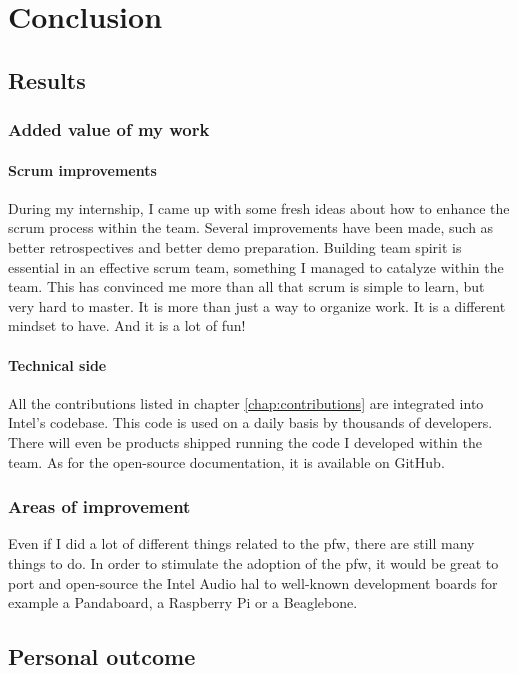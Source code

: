 \chapter{Conclusion}

\section{Results}

\subsection{Added value of my work}
\subsubsection{Scrum improvements}
During my internship, I came up with some fresh ideas about how to enhance the \gls{scrum} process within the team.
Several improvements have been made, such as better retrospectives and better demo preparation.
Building team spirit is essential in an effective \gls{scrum} team, something I managed to catalyze within the team.
This has convinced me more than all that \gls{scrum} is simple to learn, but very hard to master.
It is more than just a way to organize work. It is a different mindset to have. And it is a lot of fun!

\subsubsection{Technical side}
All the contributions listed in chapter \ref{chap:contributions} are integrated into Intel's codebase.
This code is used on a daily basis by thousands of developers. There will even be products shipped running the
code I developed within the team.
As for the open-source documentation, it is available on \gls{GitHub}.

\subsection{Areas of improvement}
Even if I did a lot of different things related to the \gls{pfw}, there are still many things to do.
In order to stimulate the adoption of the \gls{pfw}, it would be great to
port and open-source the Intel Audio \gls{hal} to well-known development boards for example a
Pandaboard, a Raspberry Pi or a Beaglebone.


\section{Personal outcome}

